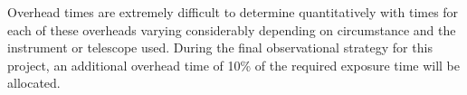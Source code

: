 		Overhead times are extremely difficult to determine quantitatively with times for each of these overheads varying considerably depending on circumstance and the instrument or telescope used. During the final observational strategy for this project, an additional overhead time of 10\% of the required exposure time will be allocated.
